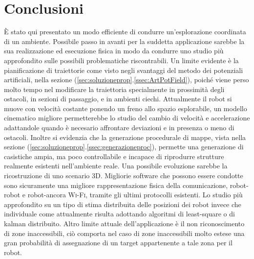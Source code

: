 \section{Conclusioni}
\label{sec:conclusioni}
È stato qui presentato un modo efficiente di condurre un'esplorazione coordinata
di un ambiente.
Possibile passo in avanti per la suddetta applicazione sarebbe la sua
realizzazione ed esecuzione fisica in modo da condurre uno studio più
approfondito sulle possibili problematiche riscontrabili.
Un limite evidente è la pianificazione di traiettorie come visto negli svantaggi
del metodo dei potenziali artificiali, nella sezione
(\ref{sec:soluzioneprop}.\ref{ssec:ArtPotField}), poiché viene perso molto tempo
nel modificare la traiettoria specialmente in prossimità degli ostacoli,
in sezioni di passaggio, e in ambienti ciechi.
Attualmente il robot si muove con velocità costante ponendo un freno allo spazio
esplorabile, un modello cinematico migliore permetterebbe lo studio del cambio
di velocità e accelerazione adattandole quando è necesario affrontare
deviazioni e in presenza o meno di ostacoli.
Inoltre si evidenzia che la generazione procedurale di mappe, vista nella
sezione (\ref{sec:soluzioneprop}.\ref{ssec:generazioneproc}), permette una
generazione di casistiche ampia, ma poco controllabile e incapace di riprodurre
strutture realmente esistenti nell'ambiente reale.
Una possibile evoluzione sarebbe la ricostruzione di uno scenario 3D.
Migliorie software che possono essere condotte sono sicuramente una migliore
rappresentazione fisica della comunicazione, robot-robot e robot-ancora
\textsc{Wi-Fi}, tramite gli ultimi protocolli esistenti.
Lo studio più approfondito su un tipo di stima distribuita delle posizioni dei
robot invece che individuale come attualmente risulta adottando algoritmi di
least-square o di kalman distribuito.
Altro limite attuale dell'applicazione è il non riconoscimento di zone
inaccessibili, ciò comporta nel caso di zone inaccessibili molto estese una gran
probabilità di assegnazione di un target appartenente a tale zona per il robot.
